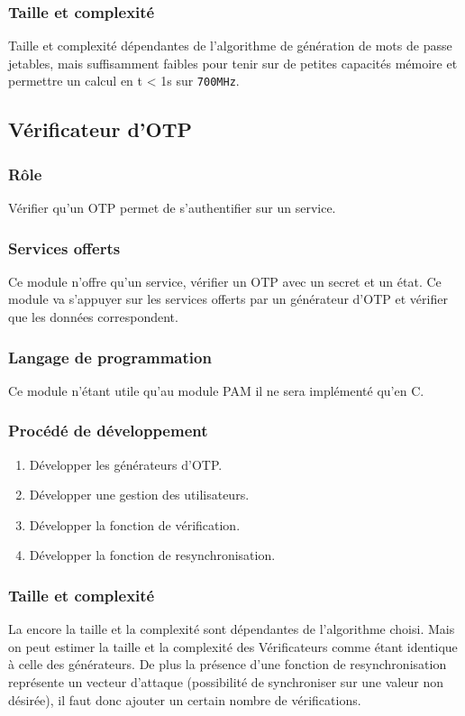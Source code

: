 \documentclass{"../../res/univ-projet"}
\begin{document}
    \subsubsection{Taille et complexité}
            Taille et complexité dépendantes de l'algorithme de génération
        de mots de passe jetables, mais suffisamment faibles pour tenir sur
        de petites capacités mémoire et permettre un calcul 
        en t < 1s sur \verb?700MHz?.

\subsection{Vérificateur d'OTP}
  \subsubsection{Rôle}
    Vérifier qu'un OTP permet de s'authentifier sur un service.
    
  \subsubsection{Services offerts}
    Ce module n'offre qu'un service, vérifier un OTP avec un secret
    et un état. Ce module va s'appuyer sur les services offerts par
    un générateur d'OTP et vérifier que les données correspondent.
    
  \subsubsection{Langage de programmation}
    Ce module n'étant utile qu'au module PAM il ne sera implémenté qu'en C.
    
  \subsubsection{Procédé de développement}
  \begin{enumerate}
   \item Développer les générateurs d'OTP.
   \item Développer une gestion des utilisateurs.
   \item Développer la fonction de vérification.
   \item Développer la fonction de resynchronisation.
  \end{enumerate}
  
  \subsubsection{Taille et complexité}
  La encore la taille et la complexité sont dépendantes de l'algorithme 
  choisi. Mais on peut estimer la taille et la complexité des Vérificateurs
  comme étant identique à celle des générateurs. De plus la présence d'une fonction
  de resynchronisation représente un  vecteur d'attaque (possibilité de synchroniser
  sur une valeur non désirée), il faut donc ajouter un certain nombre de vérifications.
  
\end{document}
